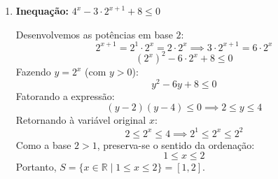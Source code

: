\documentclass[12pt,a4paper]{report}
\begin{document}
\begin{enumerate}[label=\textbf{\arabic*.}]
		\vspace{0.4cm}
		
		\item \textbf{Inequação:} $4^x - 3 \cdot 2^{x+1} + 8 \leqslant 0$
		
		Desenvolvemos as potências em base $2$:
		\[
		2^{x+1} = 2^1 \cdot 2^x = 2 \cdot 2^x \implies 3 \cdot 2^{x+1} = 6 \cdot 2^x
		\]
		\[
		(2^x)^2 - 6 \cdot 2^x + 8 \leqslant 0
		\]
		Fazendo $y = 2^x$ (com $y > 0$):
		\[
		y^2 - 6y + 8 \leqslant 0
		\]
		Fatorando a expressão:
		\[
		(y - 2)(y - 4) \leqslant 0 \implies 2 \leqslant y \leqslant 4
		\]
		Retornando à variável original $x$:
		\[
		2 \leqslant 2^x \leqslant 4 \implies 2^1 \leqslant 2^x \leqslant 2^2
		\]
		Como a base $2 > 1$, preserva-se o sentido da ordenação:
		\[
		1 \leqslant x \leqslant 2
		\]
		Portanto, $S = \{x \in \mathbb{R} \mid 1 \leqslant x \leqslant 2\} = [1, 2]$.
		
	\end{enumerate}
\end{document}
